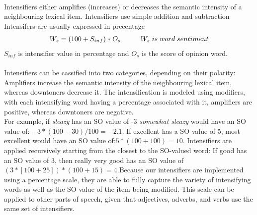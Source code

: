 \paragraph{} Intensifiers either amplifies (increases) or decreases the semantic intensity of a neighbouring lexical item.
Intensifiers use simple addition and subtraction 
Intensifers are usually expressed in precentage
$$
W_s = (100 + S_{inf}) * O_s   \hspace{1cm}
W_s \hspace{0.1cm} is\hspace{0.1cm} word \hspace{0.1cm} sentiment\\ $$ 
$ S_{inf} $ is intensifier value in percentage and $ O_s $ is the score of opinion word.
\\  \\
Intensifiers can be cassified into two categories, depending on their polarity: Amplifiers increase the semantic intensity of the neighbouring lexical item, whereas downtoners decrease it. The intensification is modeled using modifiers, with each intensifying word having a percentage associated with it, amplifiers are positive, whereas downtoners are negative.
\\
For example, if \textit{sleazy} has an SO value of -3 \textit{somewhat sleazy} would have an SO value of: $ -3*(100-30)/100 = -2.1 $. 
If excellent has a SO value of 5, most excellent would
have an SO value of:$ 5 * (100 + 100) = 10$. Intensifiers are applied recursively starting from the closest to the SO-valued word: If good has an SO value of 3, then really very good has an SO value of $ (3 * [100 + 25]) *(100 + 15) = 4 $.Because our intensifiers are implemented using a percentage scale, they are able to fully capture the variety of intensifying words as well as the SO value of the item
being modified. This scale can be applied to other parts of speech, given that adjectives, adverbs, and verbs use the same set of intensifiers.


